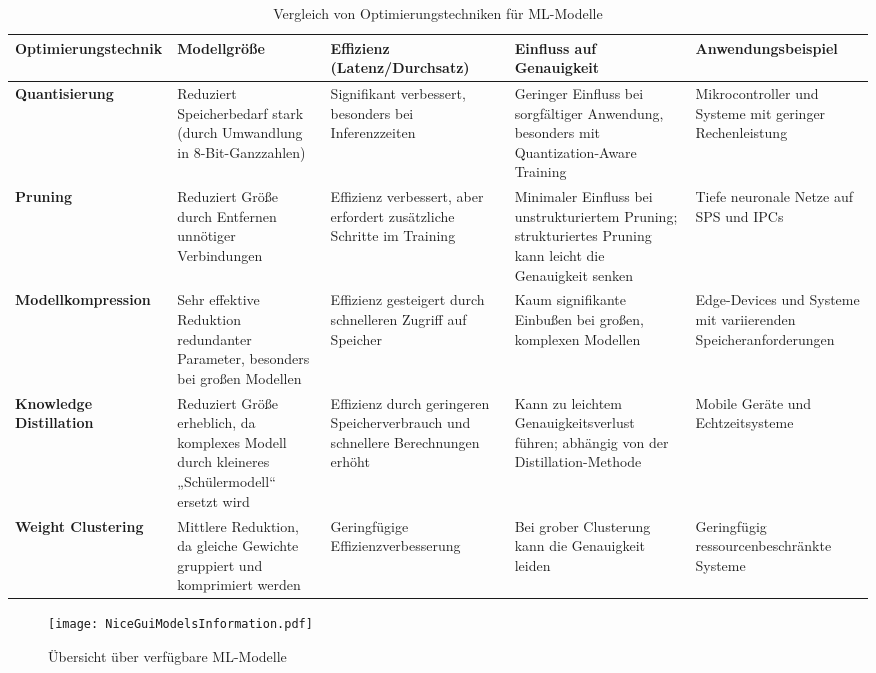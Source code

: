 \begin{sidewaystable}[h!]
    \centering
    \caption{Vergleich von Optimierungstechniken für ML-Modelle}
    \begin{tabular}{|l|p{4cm}|p{4cm}|p{4cm}|p{4cm}|}
    \hline
    \textbf{Optimierungstechnik} & \textbf{Modellgröße} & \textbf{Effizienz (Latenz/Durchsatz)} & \textbf{Einfluss auf Genauigkeit} & \textbf{Anwendungsbeispiel} \\ \hline
    \textbf{Quantisierung} & Reduziert Speicherbedarf stark (durch Umwandlung in 8-Bit-Ganzzahlen) & Signifikant verbessert, besonders bei Inferenzzeiten & Geringer Einfluss bei sorgfältiger Anwendung, besonders mit Quantization-Aware Training & Mikrocontroller und Systeme mit geringer Rechenleistung \\ \hline
    \textbf{Pruning} & Reduziert Größe durch Entfernen unnötiger Verbindungen & Effizienz verbessert, aber erfordert zusätzliche Schritte im Training & Minimaler Einfluss bei unstrukturiertem Pruning; strukturiertes Pruning kann leicht die Genauigkeit senken & Tiefe neuronale Netze auf SPS und IPCs \\ \hline
    \textbf{Modellkompression} & Sehr effektive Reduktion redundanter Parameter, besonders bei großen Modellen & Effizienz gesteigert durch schnelleren Zugriff auf Speicher & Kaum signifikante Einbußen bei großen, komplexen Modellen & Edge-Devices und Systeme mit variierenden Speicheranforderungen \\ \hline
    \textbf{Knowledge Distillation} & Reduziert Größe erheblich, da komplexes Modell durch kleineres „Schülermodell“ ersetzt wird & Effizienz durch geringeren Speicherverbrauch und schnellere Berechnungen erhöht & Kann zu leichtem Genauigkeitsverlust führen; abhängig von der Distillation-Methode & Mobile Geräte und Echtzeitsysteme \\ \hline
    \textbf{Weight Clustering} & Mittlere Reduktion, da gleiche Gewichte gruppiert und komprimiert werden & Geringfügige Effizienzverbesserung & Bei grober Clusterung kann die Genauigkeit leiden & Geringfügig ressourcenbeschränkte Systeme \\ \hline
    \end{tabular}
    \label{tab:appendix_table}
\end{sidewaystable}

\begin{figure}[h!]
    \centering
    \texttt{[image: NiceGuiModelsInformation.pdf]} 
    \caption{Übersicht über verfügbare ML-Modelle} 
    \label{fig:NiceGUI_Models}
\end{figure}